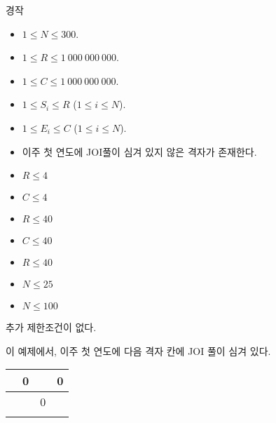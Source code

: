 \begin{problem}{경작}
\begin{itemize}
	\item $1 \le N \le 300$.
	\item $1 \le R \le 1\ 000\ 000\ 000$.
	\item $1 \le C \le 1\ 000\ 000\ 000$.
	\item $1 \le S_i \le R$ ($1 \le i \le N$).
	\item $1 \le E_i \le C$ ($1 \le i \le N$).
	\item 이주 첫 연도에 JOI풀이 심겨 있지 않은 격자가 존재한다.		
	\end{itemize}
	
	
	\begin{itemize}
		\item $R \le 4$
		\item $C \le 4$
	\end{itemize}

	\begin{itemize}
		\item $R \le 40$
		\item $C \le 40$
	\end{itemize}

	\begin{itemize}
		\item $R \le 40$
	\end{itemize}

	\begin{itemize}
		\item $N \le 25$
	\end{itemize}


	\begin{itemize}
		\item $N \le 100$
	\end{itemize}
	
	
	
	추가 제한조건이 없다.
	
	\Examples
		
	\begin{example}
	\end{example}

	이 예제에서, 이주 첫 연도에 다음 격자 칸에 JOI 풀이 심겨 있다.
	
	
	\begin{center}
	
		\begin{tabular}{|l|l|l|l|}
			\hline
		\phantom{0}	& 0 &   & 0 \\ \hline
			&   & 0 &   \\ \hline
			&   &   &   \\ \hline
		\end{tabular}
	

\end{center}
\end{problem}

